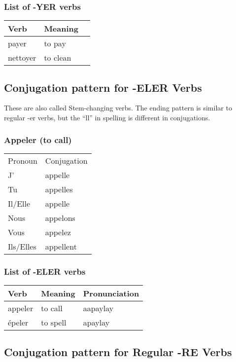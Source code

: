 \subsubsection{List of -YER verbs}
\begin{longtable}{| l | l | l |}
\hline
Verb 		& Meaning 	\\
\hline
\endhead
payer 	& to pay	\\  \hline
nettoyer	& to clean		\\  \hline
\end{longtable}


\subsection{Conjugation pattern for -ELER Verbs}
These are also called Stem-changing verbs. The ending pattern is similar
to regular -er verbs, but the ``ll'' in spelling is different in conjugations.

\subsubsection{Appeler (to call)}
\begin{tabular}{| l | l |}
\hline
Pronoun 	& 	Conjugation	\\
J'		&	appelle		\\
Tu		&	appelles	\\
Il/Elle		&	appelle		\\
Nous		&	appelons	\\
Vous		&	appelez		\\
Ils/Elles	&	appellent	\\
\hline
\end{tabular}

\subsubsection{List of -ELER verbs}
\begin{longtable}{| l | l | l |}
\hline
Verb 		& Meaning 		& Pronunciation	\\
\hline
\endhead
appeler 	& to call		& aapaylay	\\
\'epeler 	& to spell		& apaylay	\\
\hline
\end{longtable}

\subsection{Conjugation pattern for Regular -RE Verbs}

